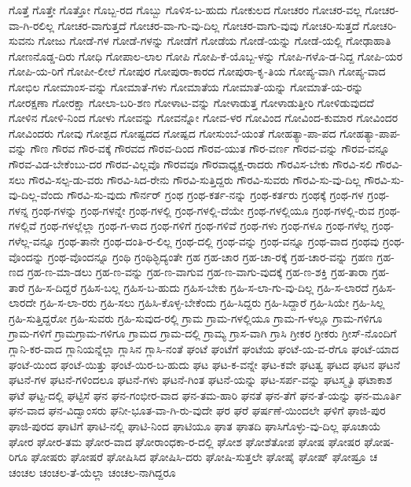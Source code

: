 {ಗೊತ್ತೆ
ಗೊತ್ತೇ
ಗೊತ್ತೋ
ಗೊಬ್ಬ-ರದ
ಗೊಬ್ಬು
ಗೊಳಿಸ-ಬ-ಹುದು
ಗೋಕುಲದ
ಗೋಚರಂ
ಗೋಚರ-ವಲ್ಲ
ಗೋಚರ-ವಾ-ಗಿ-ರಲಿಲ್ಲ
ಗೋಚರ-ವಾಗುತ್ತದೆ
ಗೋಚರ-ವಾ-ಗು-ವು-ದಿಲ್ಲ
ಗೋಚರ-ವಾಗು-ವುವು
ಗೋಚರಿ-ಸುತ್ತದೆ
ಗೋಚರಿ-ಸುವನು
ಗೋಜು
ಗೋಡೆ-ಗಳ
ಗೋಡೆ-ಗಳನ್ನು
ಗೋಡೆಗೆ
ಗೋಡೆಯ
ಗೋಡೆ-ಯನ್ನು
ಗೋಡೆ-ಯಲ್ಲಿ
ಗೋಢಾಹಾತಿ
ಗೋಣನೊಡ್ಡ-ದಿರು
ಗೋಧಿ
ಗೋಪಾಲ-ಲಾಲ
ಗೋಪಿ
ಗೋಪಿ-ಕೆ-ಯೊಬ್ಬ-ಳನ್ನು
ಗೋಪಿ-ಗಳೊ-ಡ-ನಿದ್ದ
ಗೋಪಿ-ಯರ
ಗೋಪಿ-ಯ-ರಿಗೆ
ಗೋಪೀ-ಲೀಲೆ
ಗೋಪುರ
ಗೋಪುರಾ-ಕಾರದ
ಗೋಪುರಾ-ಕೃ-ತಿಯ
ಗೋಪ್ಯ-ವಾಗಿ
ಗೋಪ್ಯ-ವಾದ
ಗೋಭಿಲ
ಗೋಮಾಂಸ-ವನ್ನು
ಗೋಮಾತೆ-ಗಳು
ಗೋಮಾತೆಯ
ಗೋಮಾತೆ-ಯನ್ನು
ಗೋಮಾತೆ-ಯ-ರನ್ನು
ಗೋರಕ್ಷಣಾ
ಗೋರಕ್ಷಾ
ಗೋಲಾ-ಬರಿ-ಶಣ
ಗೋಳಾಟ-ವನ್ನು
ಗೋಳಾಡುತ್ತ
ಗೋಳಾಡುತ್ತೀರಿ
ಗೋಳಿಡುವುದದೆ
ಗೋಳಿನ
ಗೋಳಿ-ನಿಂದ
ಗೋಳು
ಗೋವನ್ನು
ಗೋವನ್ನೋ
ಗೋವ-ಳರ
ಗೋವಿಂದ
ಗೋವಿಂದ-ಕುಮಾರ
ಗೋವಿಂದರ
ಗೋವಿಂದರು
ಗೋವು
ಗೋಶ್ಪದ
ಗೋಷ್ಟದದ
ಗೋಷ್ಪದ
ಗೋಸುಂಬೆ-ಯಂತೆ
ಗೋಹತ್ಯಾ-ಪಾ-ಪದ
ಗೋಹತ್ಯಾ-ಪಾಪ-ವನ್ನು
ಗೌಣ
ಗೌರವ
ಗೌರ-ವಕ್ಕೆ
ಗೌರವದ
ಗೌರವ-ದಿಂದ
ಗೌರವ-ಯುತ
ಗೌರ-ವರ್ಣ
ಗೌರವ-ವನ್ನು
ಗೌರವ-ವನ್ನೂ
ಗೌರವ-ವಿಡ-ಬೇಕೆಂಬು-ದರ
ಗೌರವ-ವಿಲ್ಲವೊ
ಗೌರವವೂ
ಗೌರವಾಧ್ಯಕ್ಷ-ರಾದರು
ಗೌರವಿಸ-ಬೇಕು
ಗೌರವಿ-ಸಲಿ
ಗೌರವಿ-ಸಲು
ಗೌರವಿ-ಸಲ್ಪ-ಡು-ವರು
ಗೌರವಿ-ಸಿದ-ರೇನು
ಗೌರವಿ-ಸುತ್ತಿದ್ದರು
ಗೌರವಿ-ಸುವರು
ಗೌರವಿ-ಸು-ವು-ದಿಲ್ಲ
ಗೌರವಿ-ಸು-ವು-ದಿಲ್ಲ-ವೆಂದು
ಗೌರವಿ-ಸು-ವುದು
ಗೌರ್ನರ್
ಗ್ರಂಥ
ಗ್ರಂಥ-ಕರ್ತ-ನನ್ನು
ಗ್ರಂಥ-ಕರ್ತರು
ಗ್ರಂಥಕ್ಕೆ
ಗ್ರಂಥ-ಗಳ
ಗ್ರಂಥ-ಗಳನ್ನ
ಗ್ರಂಥ-ಗಳನ್ನು
ಗ್ರಂಥ-ಗಳನ್ನೇ
ಗ್ರಂಥ-ಗಳಲ್ಲಿ
ಗ್ರಂಥ-ಗಳಲ್ಲಿ-ದೆಯೇ
ಗ್ರಂಥ-ಗಳಲ್ಲಿಯೂ
ಗ್ರಂಥ-ಗಳಲ್ಲಿ-ರುವ
ಗ್ರಂಥ-ಗಳಲ್ಲಿವೆ
ಗ್ರಂಥ-ಗಳಲ್ಲೆಲ್ಲಾ
ಗ್ರಂಥ-ಗ-ಳಾದ
ಗ್ರಂಥ-ಗಳಿಗೆ
ಗ್ರಂಥ-ಗಳಿವೆ
ಗ್ರಂಥ-ಗಳು
ಗ್ರಂಥ-ಗಳೂ
ಗ್ರಂಥ-ಗಳೆಲ್ಲ
ಗ್ರಂಥ-ಗಳೆಲ್ಲ-ವನ್ನೂ
ಗ್ರಂಥ-ತಾನೇ
ಗ್ರಂಥ-ದಂತಿ-ರ-ಲಿಲ್ಲ
ಗ್ರಂಥ-ದಲ್ಲಿ
ಗ್ರಂಥ-ವನ್ನು
ಗ್ರಂಥ-ವನ್ನೂ
ಗ್ರಂಥ-ವಾದ
ಗ್ರಂಥವು
ಗ್ರಂಥ-ವೊಂದನ್ನು
ಗ್ರಂಥ-ವೊಂದನ್ನೂ
ಗ್ರಂಥಿ
ಗ್ರಂಥಿಶ್ಛಿದ್ಯಂತೇ
ಗ್ರಹ
ಗ್ರಹ-ಚಾರ
ಗ್ರಹ-ಚಾ-ರಕ್ಕೆ
ಗ್ರಹ-ಚಾರ-ವನ್ನು
ಗ್ರಹಣ
ಗ್ರಹ-ಣದ
ಗ್ರಹ-ಣ-ಮಾ-ಡಲು
ಗ್ರಹ-ಣ-ವನ್ನು
ಗ್ರಹ-ಣ-ವಾಗುವ
ಗ್ರಹ-ಣ-ವಾಗು-ವುದಕ್ಕೆ
ಗ್ರಹ-ಣ-ಶಕ್ತಿ
ಗ್ರಹ-ತಾರಾ
ಗ್ರಹ-ತಾರೆ
ಗ್ರಹಿ-ಸ-ದಿದ್ದರೆ
ಗ್ರಹಿಸ-ಬಲ್ಲ
ಗ್ರಹಿಸ-ಬ-ಹುದು
ಗ್ರಹಿಸ-ಬೇಕು
ಗ್ರಹಿ-ಸ-ಲಾ-ಗು-ವು-ದಿಲ್ಲ
ಗ್ರಹಿ-ಸ-ಲಾರದೆ
ಗ್ರಹಿಸ-ಲಾರದೇ
ಗ್ರಹಿ-ಸ-ಲಾ-ರರು
ಗ್ರಹಿ-ಸಲು
ಗ್ರಹಿಸಿ-ಕೊಳ್ಳ-ಬೇಕೆಂದು
ಗ್ರಹಿ-ಸಿದ್ದರು
ಗ್ರಹಿ-ಸಿದ್ದಾರೆ
ಗ್ರಹಿ-ಸಿಯೇ
ಗ್ರಹಿ-ಸಿಲ್ಲ
ಗ್ರಹಿ-ಸುತ್ತಿದ್ದರೋ
ಗ್ರಹಿ-ಸುವರು
ಗ್ರಹಿ-ಸುವುದ-ರಲ್ಲಿ
ಗ್ರಾಮ
ಗ್ರಾಮ-ಗಳಲ್ಲಿಯೂ
ಗ್ರಾಮ-ಗ-ಳಲ್ಲೂ
ಗ್ರಾಮ-ಗಳಿಗೂ
ಗ್ರಾಮ-ಗಳಿಗೆ
ಗ್ರಾಮಗ್ರಾಮ-ಗಳಿಗೂ
ಗ್ರಾಮದ
ಗ್ರಾಮ-ದಲ್ಲಿ
ಗ್ರಾಮ್ಯ
ಗ್ರಾಸ-ವಾಗಿ
ಗ್ರಾಸಿ
ಗ್ರೀಕರ
ಗ್ರೀಕರು
ಗ್ರೀಸ್-ನೊಂದಿಗೆ
ಗ್ಲಾನಿ-ಕರ-ವಾದ
ಗ್ಲಾನಿಯನ್ನೆಲ್ಲಾ
ಗ್ಲಾಸಿನ
ಗ್ಲಾಸಿ-ನಂತೆ
ಘಂಟೆ
ಘಂಟೆಗೆ
ಘಂಟೆಯ
ಘಂಟೆ-ಯ-ವ-ರೆಗೂ
ಘಂಟೆ-ಯಾದ
ಘಂಟೆ-ಯಿಂದ
ಘಂಟೆ-ಯಿತ್ತು
ಘಂಟೆ-ಯಿರ-ಬ-ಹುದು
ಘಟ
ಘಟ-ಕ-ವನ್ನೇ
ಘಟ-ಕವೇ
ಘಟತ್ವ
ಘಟದ
ಘಟನ
ಘಟನೆ
ಘಟನೆ-ಗಳ
ಘಟನೆ-ಗಳಿಂದಲೂ
ಘಟನೆ-ಗಳು
ಘಟನೆ-ಗಿಂತ
ಘಟನೆ-ಯನ್ನು
ಘಟ-ಸರ್ಪ-ವನ್ನು
ಘಟಸ್ಮೃತಿ
ಘಟಾಕಾಶ
ಘಟೆ
ಘಟ್ಟ-ದಲ್ಲಿ
ಘಟ್ಟಿಸೆ
ಘನ
ಘನ-ಗಂಭೀರ-ವಾದ
ಘನ-ತಮ-ಹಾರಿ
ಘನತೆ
ಘನ-ತೆಗೆ
ಘನ-ತೆ-ಯನ್ನು
ಘನ-ಮೂರ್ತಿ
ಘನ-ವಾದ
ಘನ-ವಿದ್ವಾಂಸರು
ಘನೀ-ಭೂತ-ವಾ-ಗಿ-ರು-ವುದೇ
ಘರ
ಘರೆ
ಘರ್ಷಣೆ-ಯಿಂದಲೇ
ಘಳಿಗೆ
ಘಾಜಿ-ಪುರ
ಘಾಜಿ-ಪುರದ
ಘಾಟಿಗೆ
ಘಾಟಿ-ನಲ್ಲಿ
ಘಾಟಿ-ನಿಂದ
ಘಾಟಿಯೂ
ಘಾತ
ಘಾತದಿ
ಘಾಸಿಗೊಳ್ಳು-ವು-ದಿಲ್ಲ
ಘೂಚಾಯೆ
ಘೋರ
ಘೋರ-ತಮ
ಘೋರ-ವಾದ
ಘೋರಾಂಧಕಾ-ರ-ದಲ್ಲಿ
ಘೋಶ
ಘೋಶೆತೋಪ
ಘೋಷ
ಘೋಷರ
ಘೋಷ-ರಿಗೂ
ಘೋಷರು
ಘೋಷರೆ
ಘೋಷಿಸಿದ
ಘೋಷಿಸಿ-ದರು
ಘೋಷಿ-ಸುತ್ತಲೇ
ಘೋಷೈ
ಘೋಷ್
ಘೋಷ್ರೂ
ಚ
ಚಂಚಲ
ಚಂಚಲ-ತೆ-ಯೆಲ್ಲಾ
ಚಂಚಲ-ನಾಗಿದ್ದರೂ
}
